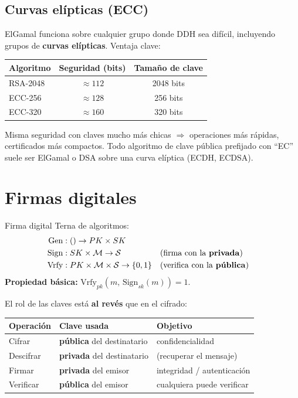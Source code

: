 \documentclass[11pt,a4paper]{article}
\begin{document}
\subsection{Curvas elípticas (ECC)}

ElGamal funciona sobre cualquier grupo donde DDH sea difícil, incluyendo grupos de
\textbf{curvas elípticas}. Ventaja clave:

\begin{center}
\begin{tabular}{lcc}
\toprule
Algoritmo & Seguridad (bits) & Tamaño de clave \\
\midrule
RSA-2048  & $\approx 112$ & 2048 bits \\
ECC-256   & $\approx 128$ & 256 bits  \\
ECC-320   & $\approx 160$ & 320 bits  \\
\bottomrule
\end{tabular}
\end{center}

Misma seguridad con claves mucho más chicas $\Rightarrow$ operaciones más rápidas,
certificados más compactos. Todo algoritmo de clave pública prefijado con ``EC''
suele ser ElGamal o DSA sobre una curva elíptica (ECDH, ECDSA).

\section{Firmas digitales}

\begin{definicion}{Firma digital}
Terna de algoritmos:
\begin{align*}
\mathrm{Gen}  &: () \to PK \times SK\\
\mathrm{Sign} &: SK \times \mathcal{M} \to \mathcal{S}
  &&\text{(firma con la \textbf{privada})}\\
\mathrm{Vrfy} &: PK \times \mathcal{M} \times \mathcal{S} \to \{0,1\}
  &&\text{(verifica con la \textbf{pública})}
\end{align*}
\textbf{Propiedad básica:} $\mathrm{Vrfy}_{pk}(m,\, \mathrm{Sign}_{sk}(m)) = 1$.
\end{definicion}

\begin{destacado}
El rol de las claves está \textbf{al revés} que en el cifrado:\\
\begin{tabular}{lll}
Operación & Clave usada & Objetivo\\
\hline
Cifrar & \textbf{pública} del destinatario & confidencialidad\\
Descifrar & \textbf{privada} del destinatario & (recuperar el mensaje)\\
Firmar & \textbf{privada} del emisor & integridad / autenticación\\
Verificar & \textbf{pública} del emisor & cualquiera puede verificar\\
\end{tabular}
\end{destacado}
\end{document}
